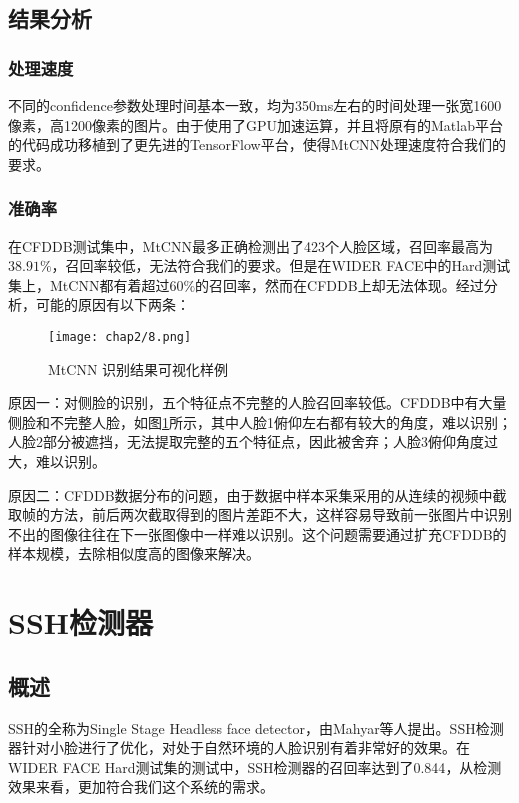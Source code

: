 \subsection{结果分析}

\subsubsection{处理速度}

不同的confidence参数处理时间基本一致，均为350ms左右的时间处理一张宽1600像素，高1200像素的图片。由于使用了GPU加速运算，并且将原有的Matlab平台的代码成功移植到了更先进的TensorFlow平台，使得MtCNN处理速度符合我们的要求。

\subsubsection{准确率}

在CFDDB测试集中，MtCNN最多正确检测出了423个人脸区域，召回率最高为$38.91\%$，召回率较低，无法符合我们的要求。但是在WIDER FACE中的Hard测试集上，MtCNN都有着超过$60\%$的召回率\cite{zhang2016joint}，然而在CFDDB上却无法体现。经过分析，可能的原因有以下两条：

\begin{figure}[!htp]
	\centering
	\texttt{[image: chap2/8.png]}
	\caption{MtCNN 识别结果可视化样例}
	\label{fig:mtcnn:accr}
\end{figure}


原因一：对侧脸的识别，五个特征点不完整的人脸召回率较低。CFDDB中有大量侧脸和不完整人脸，如图\ref{fig:mtcnn:accr}所示，其中人脸1俯仰左右都有较大的角度，难以识别；人脸2部分被遮挡，无法提取完整的五个特征点，因此被舍弃；人脸3俯仰角度过大，难以识别。


原因二：CFDDB数据分布的问题，由于数据中样本采集采用的从连续的视频中截取帧的方法，前后两次截取得到的图片差距不大，这样容易导致前一张图片中识别不出的图像往往在下一张图像中一样难以识别。这个问题需要通过扩充CFDDB的样本规模，去除相似度高的图像来解决。

\section{SSH检测器}

\subsection{概述}
SSH的全称为Single Stage Headless face detector\cite{najibi2017ssh}，由Mahyar等人提出。SSH检测器针对小脸进行了优化，对处于自然环境的人脸识别有着非常好的效果。在WIDER FACE Hard测试集的测试中，SSH检测器的召回率达到了0.844\cite{najibi2017ssh}，从检测效果来看，更加符合我们这个系统的需求。

